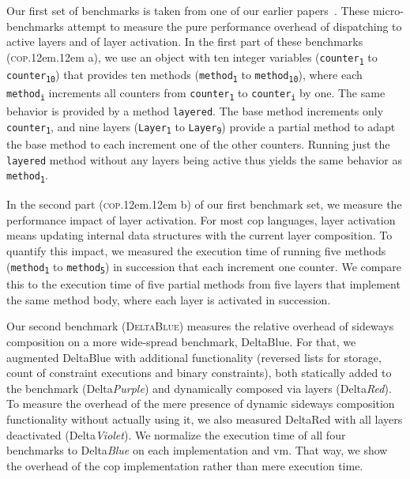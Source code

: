 \documentclass[preprint,english,10pt,nonatbib]{sigplanconf}
\DeclareRobustCommand*\copa{\textsc{cop}\kern .12em\oldstylenums{09}\kern .12em a\xspace}
\DeclareRobustCommand*\copb{\textsc{cop}\kern .12em\oldstylenums{09}\kern .12em b\xspace}
\DeclareRobustCommand*\deltablue{\textsc{DeltaBlue}\xspace}
\begin{document}
Our first set of benchmarks is taken from one of our earlier
papers~\cite{appeltauer+:2009:comparison-context-oriented}. These
micro-benchmarks attempt to measure the pure performance overhead of
dispatching to active layers and of layer activation. In the first part of
these benchmarks (\copa), we use an object with ten integer variables
(\texttt{counter\textsubscript{1}} to \texttt{counter\textsubscript{10}}) that
provides ten methods (\texttt{method\textsubscript{1}} to
\texttt{method\textsubscript{10}}), where each \texttt{method\textsubscript{i}}
increments all counters from \texttt{counter\textsubscript{1}} to
\texttt{counter\textsubscript{i}} by one. The same behavior is provided by a
method \texttt{layered}. The base method increments only
\texttt{counter\textsubscript{1}}, and nine layers
(\texttt{Layer\textsubscript{1}} to \texttt{Layer\textsubscript{9}}) provide a
partial method to adapt the base method to each increment one of the other
counters. Running just the \texttt{layered} method without any layers being
active thus yields the same behavior as \texttt{method\textsubscript{1}}.


In the second part (\copb) of our first benchmark set, we measure the
performance impact of layer activation. For most \ac{cop} languages, layer
activation means updating internal data structures with the current layer
composition. To quantify this impact, we measured the execution time of running
five methods (\texttt{method\textsubscript{1}} to
\texttt{method\textsubscript{5}}) in succession that each increment one
counter. We compare this to the execution time of five partial methods from
five layers that implement the same method body, where each layer is activated
in succession.


Our second benchmark (\deltablue) measures the relative overhead of sideways
composition on a more wide-spread benchmark, DeltaBlue. For that, we augmented
DeltaBlue with additional functionality (reversed lists for storage, count of
constraint executions and binary constraints), both statically added to the
benchmark (Delta\emph{Purple}) and dynamically composed via layers
(Delta\emph{Red}). To measure the overhead of the mere presence of dynamic
sideways composition functionality without actually using it, we also measured
DeltaRed with all layers deactivated (Delta\emph{Violet}). We normalize the
execution time of all four benchmarks to Delta\emph{Blue} on each
implementation and \ac{vm}. That way, we show the overhead of the \ac{cop}
implementation rather than mere execution time.
\end{document}
